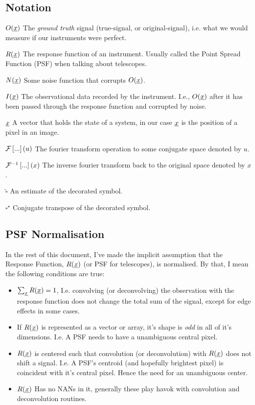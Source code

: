 

\subsection{Notation}
	\begin{description}
		\item{$O(\underline{x})$} The \emph{ground truth} signal (true-signal, or original-signal), i.e. what we would measure if our instruments were perfect.
		\item{$R(\underline{x})$} The response function of an instrument. Usually called the Point Spread Function (PSF) when talking about telescopes.
		\item{$N(\underline{x})$} Some noise function that corrupts $O(\underline{x})$.
		\item{$I(\underline{x})$} The observational data recorded by the instrument. I.e., $O(\underline{x})$ after it has been passed through the response function and corrupted by noise.
		\item{$\underline{x}$} A vector that holds the state of a system, in our case $\underline{x}$ is the position of a pixel in an image.
		\item{$\mathcal{F}\left[ ... \right](u)$} The fourier transform operation to some conjugate space denoted by $u$.
		\item{$\mathcal{F}^{-1}\left[ ... \right](x)$} The inverse fourier transform back to the original space denoted by $x$.
		\item{$\tilde{\square}$} An estimate of the decorated symbol.
		\item{$\square^\star$} Conjugate transpose of the decorated symbol.

	\end{description}		

\subsection{PSF Normalisation}
In the rest of this document, I've made the implicit assumption that the Response Function, $R(\underline{x})$ (or PSF for telescopes), is normalised. By that, I mean the following conditions are true:
\begin{itemize}
	\item $\sum_{\underline{x}} R(\underline{x}) = 1$, I.e. convolving (or deconvolving) the observation with the response function does not change the total sum of the signal, except for edge effects in some cases.
	\item If $R(\underline{x})$ is represented as a vector or array, it's shape is \emph{odd} in all of it's dimensions. I.e. A PSF needs to have a unambiguous central pixel.
	\item $R(\underline{x})$ is centered such that convolution (or deconvolution) with $R(\underline{x})$ does not shift a signal. I.e. A PSF's centroid (and hopefully brightest pixel) is coincident with it's central pixel. Hence the need for an unambiguous center.
	\item $R(\underline{x})$ Has no NANs in it, generally these play havok with convolution and deconvolution routines.
\end{itemize}
	
